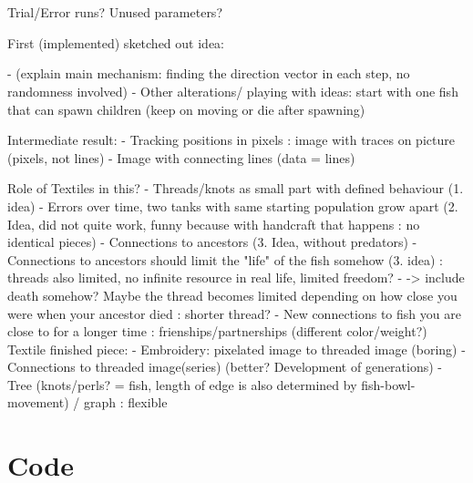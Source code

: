 \documentclass{scrartcl}
\begin{document}
\section{}
\subsection{}



Trial/Error runs? Unused parameters?

First (implemented) sketched out idea:

-	(explain main mechanism: finding the direction vector in each step, no randomness involved)
-	Other alterations/ playing with ideas: start with one fish that can spawn children (keep on moving or die after spawning)

Intermediate result:
-	Tracking positions in pixels : image with traces on picture (pixels, not lines)
-	Image with connecting lines (data = lines)

Role of Textiles in this?
-	Threads/knots as small part with defined behaviour (1. idea)
-	Errors over time, two tanks with same starting population grow apart (2. Idea, did not quite work, funny because with handcraft that happens : no identical pieces)
-	Connections to ancestors (3. Idea, without predators)
-	Connections to ancestors should limit the "life" of the  fish somehow (3. idea) : threads also limited, no infinite resource in real life, limited freedom?
-	-> include death somehow? Maybe the thread becomes limited depending on how close you were when your ancestor died : shorter thread?
-	New connections to fish you are close to for a longer time : frienships/partnerships (different color/weight?)
Textile finished piece:
-	Embroidery: pixelated image to threaded image (boring)
-	Connections to threaded image(series) (better? Development of generations)
-	Tree (knots/perls? = fish, length of edge is also determined by fish-bowl-movement) / graph : flexible


\newpage
\section*{Code}


%
%
\end{document}
